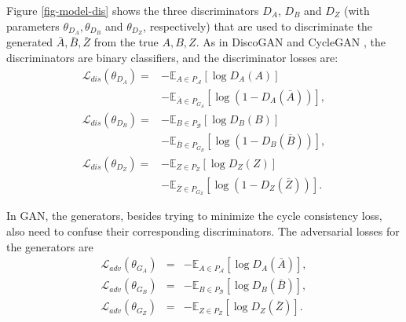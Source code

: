 \documentclass[conference]{IEEEtran}
\theoremstyle{definition}
\begin{document}
Figure \ref{fig-model-dis} shows the three discriminators $D_A$, $D_B$ and $D_Z$ (with parameters $\theta_{D_A}, \theta_{D_B}$ and $\theta_{D_Z}$, respectively) that are used to discriminate the generated $\bar{A}, \bar{B}, \bar{Z}$ from the true $A, B, Z$. As in DiscoGAN \cite{kim2017learning} and CycleGAN \cite{zhu2017unpaired}, the discriminators are binary classifiers, and the discriminator losses are:
\begin{align}
\mathcal L_{dis}(\theta_{D_A}) =& -\mathbb E_{A\in P_{\mathcal A}} \left[\log D_A( A)\right]  \nonumber \\
&- \mathbb E_{\bar{A}\in P_{G_A}}\left[\log \left(1-D_A(\bar{ A})\right)\right]  \label{loss-dis-a}, \\
\mathcal L_{dis}(\theta_{D_B}) =& -\mathbb E_{B\in P_{\mathcal B}} \left[\log D_B( B)\right]  \nonumber \\
&- \mathbb E_{\bar{B}\in P_{G_B}}\left[\log \left(1-D_B(\bar{ B})\right)\right]  \label{loss-dis-b}, \\
\mathcal L_{dis}(\theta_{D_Z}) =& -\mathbb E_{Z\in P_{Z}} \left[\log D_Z( Z)\right]  \nonumber \\
&- \mathbb E_{\bar{Z}\in P_{G_Z}}\left[\log \left(1-D_Z(\bar{ Z})\right)\right]  \label{loss-dis-z}.
\end{align}

In GAN, the generators, besides trying to minimize the cycle consistency loss, also need to confuse their corresponding discriminators. The adversarial losses for the generators are 
\begin{eqnarray*}
\mathcal L_{adv}(\theta_{G_{A}}) &=& -\mathbb E_{A\in P_{\mathcal A}}\left[\log D_A(\bar{ A})\right],\\
\mathcal L_{adv}(\theta_{G_{B}}) &=& -\mathbb E_{B\in P_{\mathcal B}}\left[\log D_B(\bar{ B})\right],\\
\mathcal L_{adv}(\theta_{G_{Z}}) &=& -\mathbb E_{Z\in P_{Z}}\left[\log D_Z(\bar{ Z})\right].\\
\end{eqnarray*}
\end{document}
